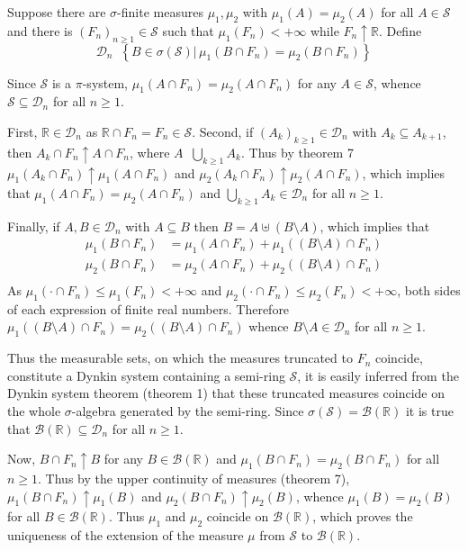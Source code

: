 \documentclass[a4paper]{article}
\newcommand{\obj}[1]{\left\{ #1 \right \}}
\newcommand{\brac}[1]{\left ( #1 \right )}
\newcommand{\induc}[1]{\left . #1 \right \vert}
\newcommand{\Real}{\mathbb{R}}
\newcommand{\Dcal}{\mathcal{D}}
\newcommand{\Scal}{\mathcal{S}}
\newcommand{\borel}[1]{\mathcal{B}\brac{#1}}
\newcommand{\defn}{\mathop{\overset{\Delta}{=}}\nolimits}
\begin{document}
Suppose there are $\sigma$-finite measures $\mu_1,\mu_2$ with $\mu_1\brac{A}=\mu_2\brac{A}$ for all $A\in \Scal$ and there is $\brac{F_n}_{n\geq1}\in \Scal$ such that $\mu_1\brac{F_n}<+\infty$ while $F_n\uparrow \Real$. Define \[\Dcal_n\defn \obj{\induc{B\in \sigma\brac{\Scal}}\,\mu_1\brac{B\cap F_n}=\mu_2\brac{B\cap F_n}}\]

Since $\Scal$ is a $\pi$-system, $\mu_1\brac{A\cap F_n}=\mu_2\brac{A\cap F_n}$ for any $A\in \Scal$, whence $\Scal\subseteq \Dcal_n$ for all $n\geq1$.

First, $\Real\in \Dcal_n$ as $\Real\cap F_n=F_n\in\Scal$. Second, if $\brac{A_k}_{k\geq1}\in \Dcal_n$ with $A_k\subseteq A_{k+1}$, then $A_k\cap F_n\uparrow A\cap F_n$, where $A\defn \bigcup_{k\geq1} A_k$. Thus by theorem 7 $\mu_1\brac{A_k\cap F_n}\uparrow\mu_1\brac{A\cap F_n}$ and $\mu_2\brac{A_k\cap F_n}\uparrow\mu_2\brac{A\cap F_n}$, which implies that $\mu_1\brac{A\cap F_n}=\mu_2\brac{A\cap F_n}$ and $\bigcup_{k\geq1} A_k\in \Dcal_n$ for all $n\geq1$.

Finally, if $A,B\in\Dcal_n$ with $A\subseteq B$ then $B=A\uplus \brac{B\setminus A}$, which implies that \begin{align*}\mu_1\brac{B\cap F_n}&=\mu_1\brac{A\cap F_n}+\mu_1\brac{\brac{B\setminus A}\cap F_n}\\\mu_2\brac{B\cap F_n}&=\mu_2\brac{A\cap F_n}+\mu_2\brac{\brac{B\setminus A}\cap F_n}\\\end{align*} As $\mu_1\brac{\cdot\cap F_n}\leq \mu_1\brac{F_n}<+\infty$ and $\mu_2\brac{\cdot\cap F_n}\leq \mu_2\brac{F_n}<+\infty$, both sides of each expression of finite real numbers. Therefore $\mu_1\brac{\brac{B\setminus A}\cap F_n}=\mu_2\brac{\brac{B\setminus A}\cap F_n}$ whence $B\setminus A\in \Dcal_n$ for all $n\geq1$.

Thus the measurable sets, on which the measures truncated to $F_n$ coincide, constitute a Dynkin system containing a semi-ring $\Scal$, it is easily inferred from the Dynkin system theorem (theorem 1) that these truncated measures coincide on the whole $\sigma$-algebra generated by the semi-ring. Since $\sigma\brac{\Scal}=\borel{\Real}$ it is true that $\borel{\Real}\subseteq \Dcal_n$ for all $n\geq1$.

Now, $B\cap F_n\uparrow B$ for any $B\in \borel{\Real}$ and $\mu_1\brac{B\cap F_n}=\mu_2\brac{B\cap F_n}$ for all $n\geq1$. Thus by the upper continuity of measures (theorem 7), $\mu_1\brac{B\cap F_n}\uparrow\mu_1\brac{B}$ and $\mu_2\brac{B\cap F_n}\uparrow\mu_2\brac{B}$, whence $\mu_1\brac{B}=\mu_2\brac{B}$ for all $B\in \borel{\Real}$. Thus $\mu_1$ and $\mu_2$ coincide on $\borel{\Real}$, which proves the uniqueness of the extension of the measure $\mu$ from $\Scal$ to $\borel{\Real}$.\\
\end{document}
